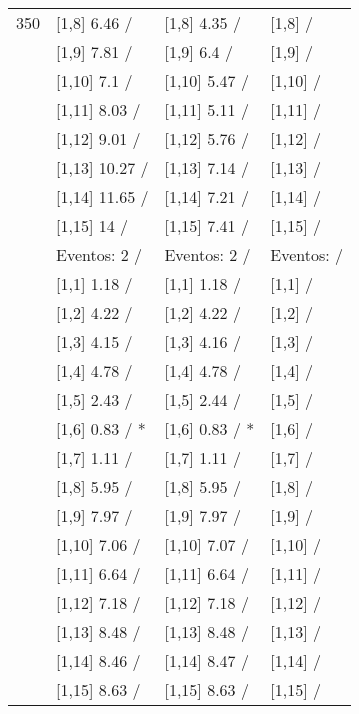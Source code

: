 \begin{table}
\begin{tabular}[t]{llll}
350 & {}[1,8] 6.46  / & {}[1,8] 4.35  / & {}[1,8]  /\\
\addlinespace
 & {}[1,9] 7.81  / & {}[1,9] 6.4  / & {}[1,9]  /\\
 & {}[1,10] 7.1  / & {}[1,10] 5.47  / & {}[1,10]  /\\
 & {}[1,11] 8.03  / & {}[1,11] 5.11  / & {}[1,11]  /\\
 & {}[1,12] 9.01  / & {}[1,12] 5.76  / & {}[1,12]  /\\
 & {}[1,13] 10.27  / & {}[1,13] 7.14  / & {}[1,13]  /\\
\addlinespace
 & {}[1,14] 11.65  / & {}[1,14] 7.21  / & {}[1,14]  /\\
 & {}[1,15] 14  / & {}[1,15] 7.41  / & {}[1,15]  /\\
 & Eventos:  2 / & Eventos:  2 / & Eventos:   /\\
 & {}[1,1] 1.18  / & {}[1,1] 1.18  / & {}[1,1]  /\\
 & {}[1,2] 4.22  / & {}[1,2] 4.22  / & {}[1,2]  /\\
\addlinespace
 & {}[1,3] 4.15  / & {}[1,3] 4.16  / & {}[1,3]  /\\
 & {}[1,4] 4.78  / & {}[1,4] 4.78  / & {}[1,4]  /\\
 & {}[1,5] 2.43  / & {}[1,5] 2.44  / & {}[1,5]  /\\
 & {}[1,6] 0.83  / * & {}[1,6] 0.83  / * & {}[1,6]  /\\
 & {}[1,7] 1.11  / & {}[1,7] 1.11  / & {}[1,7]  /\\
\addlinespace
500 & {}[1,8] 5.95  / & {}[1,8] 5.95  / & {}[1,8]  /\\
 & {}[1,9] 7.97  / & {}[1,9] 7.97  / & {}[1,9]  /\\
 & {}[1,10] 7.06  / & {}[1,10] 7.07  / & {}[1,10]  /\\
 & {}[1,11] 6.64  / & {}[1,11] 6.64  / & {}[1,11]  /\\
 & {}[1,12] 7.18  / & {}[1,12] 7.18  / & {}[1,12]  /\\
\addlinespace
 & {}[1,13] 8.48  / & {}[1,13] 8.48  / & {}[1,13]  /\\
 & {}[1,14] 8.46  / & {}[1,14] 8.47  / & {}[1,14]  /\\
 & {}[1,15] 8.63  / & {}[1,15] 8.63  / & {}[1,15]  /\\
\bottomrule
\end{tabular}
\end{table}
